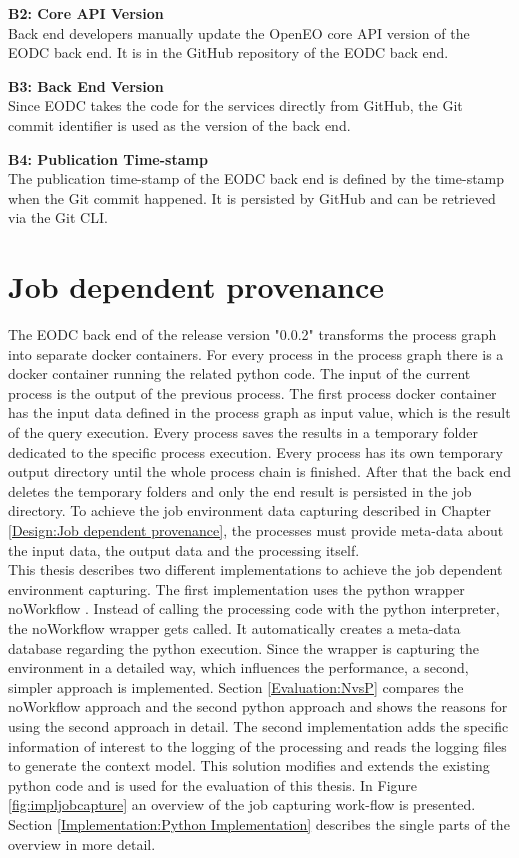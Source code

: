 \documentclass[draft,final]{vutinfth} %
\begin{document}
\textbf{B2: Core API Version} \\
Back end developers manually update the OpenEO core API version of the EODC back end. It is in the GitHub repository of the EODC back end. 

\textbf{B3: Back End Version} \\
Since EODC takes the code for the services directly from GitHub, the Git commit identifier is used as the version of the back end.

\textbf{B4: Publication Time-stamp} \\
The publication time-stamp of the EODC back end is defined by the time-stamp when the Git commit happened. It is persisted by GitHub and can be retrieved via the Git CLI. 

\section{Job dependent provenance}\label{Implementation:Job dependent provenance}
The EODC back end of the release version "0.0.2" transforms the process graph into separate docker containers. For every process in the process graph there is a docker container running the related python code. The input of the current process is the output of the previous process. The first process docker container has the input data defined in the process graph as input value, which is the result of the query execution. Every process saves the results in a temporary folder dedicated to the specific process execution. Every process has its own temporary output directory until the whole process chain is finished. After that the back end deletes the temporary folders and only the end result is persisted in the job directory.
To achieve the job environment data capturing described in Chapter \ref{Design:Job dependent provenance}, the processes must provide meta-data about the input data, the output data and the processing itself. \\ 
This thesis describes two different implementations to achieve the job dependent environment capturing. The first implementation uses the python wrapper noWorkflow \cite{c9e0604becba42af96a9cb0a6f60018b}. Instead of calling the processing code with the python interpreter, the noWorkflow wrapper gets called. It automatically creates a meta-data database regarding the python execution. Since the wrapper is capturing the environment in a detailed way, which influences the performance, a second, simpler approach is implemented. Section \ref{Evaluation:NvsP} compares the noWorkflow approach and the second python approach and shows the reasons for using the second approach in detail. The second implementation adds the specific information of interest to the logging of the processing and reads the logging files to generate the context model. This solution modifies and extends the existing python code and is used for the evaluation of this thesis. In Figure \ref{fig:impljobcapture} an overview of the job capturing work-flow is presented. Section \ref{Implementation:Python Implementation} describes the single parts of the overview in more detail.  
\end{document}
